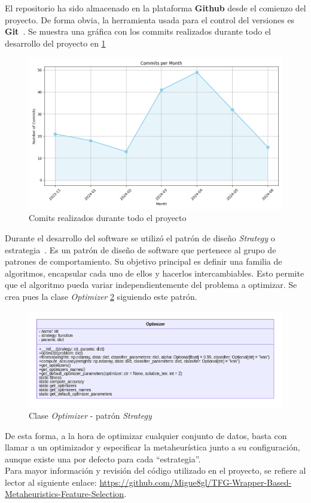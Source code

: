 El repositorio ha sido almacenado en la plataforma \textbf{Github} desde el comienzo del proyecto. De forma obvia, la herramienta usada para el control del versiones es \textbf{Git}~\cite{chacon2014pro}. Se muestra una gráfica con los commits realizados durante todo el desarrollo del proyecto en \ref{fig:commits}

\begin{figure}[htp]
    \centering
    \includegraphics[width=1\textwidth]{imagenes/commits_chart.png}
    \caption{Comits realizados durante todo el proyecto}
    \label{fig:commits}
\end{figure}

Durante el desarrollo del software se utilizó el patrón de diseño \textit{Strategy} o estrategia~\cite{refactoring-guru-strategy}. Es un patrón de diseño de software que pertenece al grupo de patrones de comportamiento. Su objetivo principal es definir una familia de algoritmos, encapsular cada uno de ellos y hacerlos intercambiables. Esto permite que el algoritmo pueda variar independientemente del problema a optimizar. Se crea pues la clase \textit{Optimizer} \ref{fig:optimizer_class} siguiendo este patrón.

\begin{figure}[htp]
    \centering
    \includegraphics[width=1.2\textwidth]{imagenes/mermaid-diagram-20240616183528.png}
    \caption{Clase \textit{Optimizer} - patrón \textit{Strategy}}
    \label{fig:optimizer_class}
\end{figure}

De esta forma, a la hora de optimizar cualquier conjunto de datos, basta con llamar a un optimizador y especificar la metaheurística junto a su configuración, aunque existe una por defecto para cada ``estrategia''.\\[6pt]
Para mayor información y revisión del código utilizado en el proyecto, se refiere al lector al siguiente enlace: \url{https://github.com/Migue8gl/TFG-Wrapper-Based-Metaheuristics-Feature-Selection}.